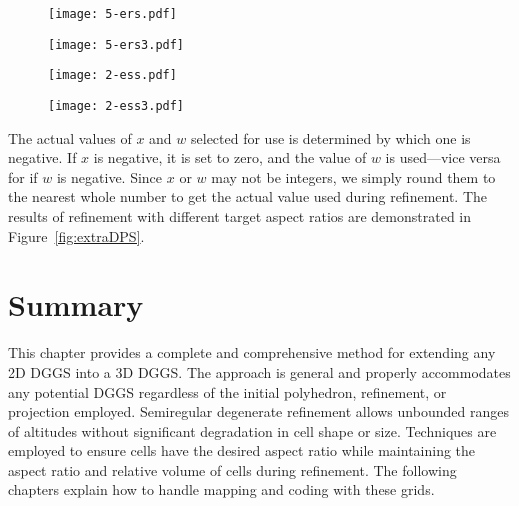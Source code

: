 \begin{figure*}[ht!]
	\centering
	\begin{subfigure}[]{0.25\textwidth}
		\centering
		\texttt{[image: 5-ers.pdf]}
		\caption{}
		\label{fig:ers1}
	\end{subfigure}%
	\begin{subfigure}[]{0.25\textwidth}
		\centering
		\texttt{[image: 5-ers3.pdf]}
		\caption{}
		\label{fig:ers3}
	\end{subfigure}%
	\begin{subfigure}[]{0.25\textwidth}
		\centering
		\texttt{[image: 2-ess.pdf]}
		\caption{}
		\label{fig:ess1}
	\end{subfigure}%
	\begin{subfigure}[]{0.25\textwidth}
		\centering
		\texttt{[image: 2-ess3.pdf]}
		\caption{}
		\label{fig:ess3}
	\end{subfigure}
	
	\caption[Prismatoid refinement modified to achieve different cell aspect ratios]{
		A demonstration of how refinement can be modified to affect the aspect ratio of cells.
		All figures show a starting pyramid cell from a grid with 200 cells in its initial discretization.
		Central layer with five extra radial splits ($a = 3$ to get $x = 5$) at (a) one level of refinement and (b) three levels.
		Central layer with two applications of the surface refinement scheme ($a = 1/8$ to get $w = 2$) at (c) one level of refinement and (d) three levels.
	}
	\label{fig:extraDPS}
\end{figure*}


The actual values of $x$ and $w$ selected for use is determined by which one is negative.
If $x$ is negative, it is set to zero, and the value of $w$ is used---vice versa for if $w$ is negative.
Since $x$ or $w$ may not be integers, we simply round them to the nearest whole number to get the actual value used during refinement.
The results of refinement with different target aspect ratios are demonstrated in Figure~\ref{fig:extraDPS}.


\section{Summary}
This chapter provides a complete and comprehensive method for extending any 2D DGGS into a 3D DGGS.
The approach is general and properly accommodates any potential DGGS regardless of the initial polyhedron, refinement, or projection employed.
Semiregular degenerate refinement allows unbounded ranges of altitudes without significant degradation in cell shape or size.
Techniques are employed to ensure cells have the desired aspect ratio while maintaining the aspect ratio and relative volume of cells during refinement.
The following chapters explain how to handle mapping and coding with these grids. 
